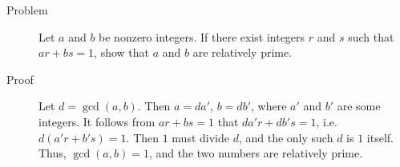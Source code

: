 \begin{description}
\item[Problem] Let $a$ and $b$ be nonzero integers. If there exist integers $r$
and $s$ such that $ar + bs = 1$, show that $a$ and $b$ are relatively prime.

\item[Proof] Let $d = \gcd(a,b)$. Then $a = d a'$, $b = d b'$, where $a'$ and
$b'$ are some integers. It follows from $ar + bs = 1$ that $da'r + db's = 1$,
i.e. $d(a'r + b's) = 1$. Then $1$ must divide $d$, and the only such $d$ is
$1$ itself. Thus, $\gcd(a, b) = 1$, and the two numbers are relatively prime.

\end{description}
